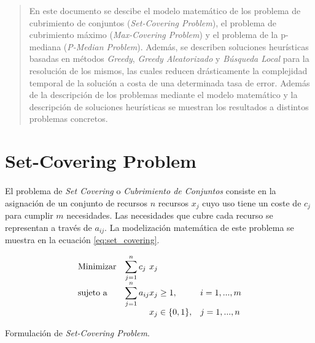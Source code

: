 \documentclass[spanish]{article}
\begin{document}
	\maketitle %

	\thispagestyle{fancy} %



	\begin{abstract}
		\noindent En este documento se descibe el modelo matemático de los problema de cubrimiento de conjuntos (\emph{Set-Covering Problem}), el problema de cubrimiento máximo (\emph{Max-Covering Problem}) y el problema de la p-mediana (\emph{P-Median Problem}). Además, se describen soluciones heurísticas basadas en métodos \emph{Greedy}, \emph{Greedy Aleatorizado} y \emph{Búsqueda Local} para la resolución de los mismos, las cuales reducen drásticamente la complejidad temporal de la solución a costa de una determinada tasa de error. Además de la descripción de los problemas mediante el modelo matemático y la descripción de soluciones heurísticas se muestran los resultados a distintos problemas concretos.
	\end{abstract}


	\setcounter{section}{5}

	\section{Set-Covering Problem}
	\label{sec:e-6}

		\paragraph{}
		El problema de \emph{Set Covering} o \emph{Cubrimiento de Conjuntos} consiste en la asignación de un conjunto de recursos $n$ recursos $x_{j}$ cuyo uso tiene un coste de $c_{j}$ para cumplir $m$ necesidades. Las necesidades que cubre cada recurso se representan a través de $a_{ij}$. La modelización matemática de este problema se muestra en la ecuación \eqref{eq:set_covering}.

		\begin{eqfloat}
			\begin{equation}
				\begin{array}{ll@{}ll}
					\text{Minimizar}	& \displaystyle\sum\limits_{j=1}^{n} c_{j}	&	x_{j} &\\
					\text{sujeto a}		& \displaystyle\sum\limits_{j = 1}^n a_{ij}	&	x_{j} \geq 1,  &i=1 ,..., m\\
														&                                           &	x_{j} \in \{0,1\}, &j=1 ,..., n
				\end{array}
			\end{equation}
			\caption{Formulación de \emph{Set-Covering Problem}.}
			\label{eq:set_covering}
		\end{eqfloat}
\end{document}
